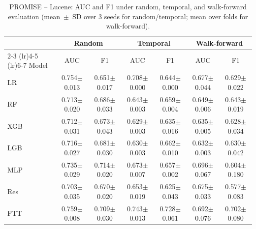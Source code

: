 \begin{table}[htbp]
\centering
\caption{PROMISE -- Lucene: AUC and F1 under random, temporal, and walk-forward evaluation (mean~$\pm$~SD over 3 seeds for random/temporal; mean over folds for walk-forward).}
\label{tab:supp-lucene}
\scriptsize
\begin{tabular}{l cc cc cc}
\toprule
 & \multicolumn{2}{c}{Random} & \multicolumn{2}{c}{Temporal} & \multicolumn{2}{c}{Walk-forward} \\
\cmidrule(lr){2-3} \cmidrule(lr){4-5} \cmidrule(lr){6-7}
Model & AUC & F1 & AUC & F1 & AUC & F1 \\
\midrule
LR & 0.754$\pm$0.013 & 0.651$\pm$0.017 & 0.708$\pm$0.000 & 0.644$\pm$0.000 & 0.677$\pm$0.044 & 0.629$\pm$0.022 \\
RF & 0.713$\pm$0.020 & 0.686$\pm$0.033 & 0.643$\pm$0.003 & 0.659$\pm$0.004 & 0.649$\pm$0.006 & 0.643$\pm$0.019 \\
XGB & 0.712$\pm$0.031 & 0.673$\pm$0.043 & 0.629$\pm$0.003 & 0.635$\pm$0.016 & 0.635$\pm$0.005 & 0.628$\pm$0.034 \\
LGB & 0.716$\pm$0.027 & 0.681$\pm$0.030 & 0.630$\pm$0.003 & 0.662$\pm$0.010 & 0.632$\pm$0.003 & 0.630$\pm$0.042 \\
MLP & 0.735$\pm$0.029 & 0.714$\pm$0.020 & 0.673$\pm$0.007 & 0.657$\pm$0.002 & 0.696$\pm$0.067 & 0.604$\pm$0.180 \\
Res & 0.703$\pm$0.035 & 0.670$\pm$0.020 & 0.653$\pm$0.019 & 0.625$\pm$0.043 & 0.675$\pm$0.033 & 0.577$\pm$0.083 \\
FTT & 0.759$\pm$0.008 & 0.709$\pm$0.030 & 0.743$\pm$0.013 & 0.728$\pm$0.061 & 0.692$\pm$0.076 & 0.702$\pm$0.080 \\
\bottomrule
\end{tabular}
\end{table}

